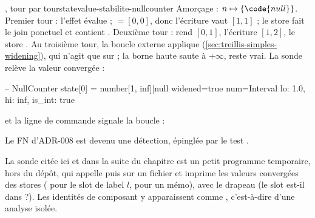 \begin{exemple}{, tour par tour}{statevalue-stabilite-nullcounter}
  Amorçage : $n \mapsto \{\code{null}\}$. Premier tour : l'effet évalue
   ;  $= [0,0]$, donc l'écriture vaut
  $[1,1]$ ; le store fait le join ponctuel et contient
  . Deuxième tour :  rend
  $[0,1]$, l'écriture $[1,2]$, le store . Au
  troisième tour, la boucle externe applique 
  (\cref{sec:treillis-simples-widening}), qui n'agit que sur  ;
  la borne haute saute à $+\infty$,  reste vrai. La sonde relève
  la valeur convergée :
\begin{sortie}
-- NullCounter
   state[0] = number[1, inf]|null   widened=true  num=Interval { lo: 1.0, hi: inf, is_int: true }
\end{sortie}
  et la ligne de commande signale la boucle :
  Le FN d'ADR-008 est devenu une détection, épinglée par le test
  .
\end{exemple}

La \og sonde\fg{} citée ici et dans la suite du chapitre est un petit
programme temporaire, hors du dépôt, qui appelle  puis
 sur un fichier et imprime les valeurs convergées
des stores ( pour le slot de label $l$,  pour
un mémo), avec le drapeau  (le slot est-il dans
 ?). Les identités de composant y apparaissent comme
, c'est-à-dire 
d'une analyse isolée.


